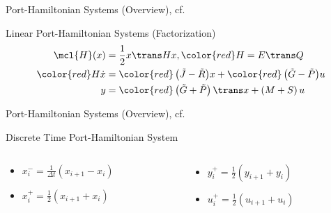 \begin{frame}{Port-Hamiltonian Systems (Overview), cf.~\cite{Morandin2022}}
    \begin{block}{Linear Port-Hamiltonian Systems (Factorization)}
        \begin{align*}
            \mcl{H}(x) &= \frac{1}{2} x\trans H x, {\color{red}H = E\trans Q} \\
            {\color{red}H} \dot{x} &= {\color{red}\left( \tilde{J} - \tilde{R} \right)} x + {\color{red}\left( \tilde{G} - \tilde{P} \right)} u \\
            y &= {\color{red}\left( \tilde{G} + \tilde{P} \right)\trans} x + \left( M + S \right) u
        \end{align*}
    \end{block}
\end{frame}

\begin{frame}{Port-Hamiltonian Systems (Overview), cf.~\cite{Morandin2022}}
    \begin{block}{Discrete Time Port-Hamiltonian System}
    \end{block}

    \begin{columns}
        \begin{column}{.27\textwidth}
            \begin{itemize}
                \item $x_i^- = \frac{1}{\Delta t} (x_{i + 1} - x_i)$
                \item $x_i^+ = \frac{1}{2} (x_{i + 1} + x_i)$
            \end{itemize}
        \end{column}
        \begin{column}{.27\textwidth}
            \begin{itemize}
                \item $y_i^+ = \frac{1}{2} (y_{i + 1} + y_i)$
                \item $u_i^+ = \frac{1}{2} (u_{i + 1} + u_i)$
            \end{itemize}
        \end{column}
    \end{columns}
\end{frame}